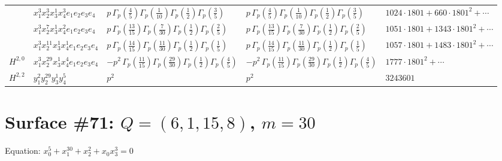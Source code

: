 \documentclass[11pt]{article}
\begin{document}
\begin{table}[ht]
{\begin{tabular}{@{}lllll@{}}
 & $x_{1}^{3} x_{2}^{3} x_{3}^{1} x_{4}^{3}  e_{1} e_{2} e_{3} e_{4}$ & $p \, \Gamma_p \left( \frac{4}{5} \right) \Gamma_p \left( \frac{1}{10} \right) \Gamma_p \left( \frac{1}{2} \right) \Gamma_p \left( \frac{3}{5} \right)$ & $p \, \Gamma_p \left( \frac{4}{5} \right) \Gamma_p \left( \frac{1}{10} \right) \Gamma_p \left( \frac{1}{2} \right) \Gamma_p \left( \frac{3}{5} \right)$ & $1024{\cdot}1801{+}660{\cdot}1801^{2}{+}\cdots$ \\
 & $x_{1}^{3} x_{2}^{7} x_{3}^{1} x_{4}^{2}  e_{1} e_{2} e_{3} e_{4}$ & $p \, \Gamma_p \left( \frac{13}{15} \right) \Gamma_p \left( \frac{7}{30} \right) \Gamma_p \left( \frac{1}{2} \right) \Gamma_p \left( \frac{2}{5} \right)$ & $p \, \Gamma_p \left( \frac{13}{15} \right) \Gamma_p \left( \frac{7}{30} \right) \Gamma_p \left( \frac{1}{2} \right) \Gamma_p \left( \frac{2}{5} \right)$ & $1051{\cdot}1801{+}1343{\cdot}1801^{2}{+}\cdots$ \\
 & $x_{1}^{3} x_{2}^{11} x_{3}^{1} x_{4}^{1}  e_{1} e_{2} e_{3} e_{4}$ & $p \, \Gamma_p \left( \frac{14}{15} \right) \Gamma_p \left( \frac{11}{30} \right) \Gamma_p \left( \frac{1}{2} \right) \Gamma_p \left( \frac{1}{5} \right)$ & $p \, \Gamma_p \left( \frac{14}{15} \right) \Gamma_p \left( \frac{11}{30} \right) \Gamma_p \left( \frac{1}{2} \right) \Gamma_p \left( \frac{1}{5} \right)$ & $1057{\cdot}1801{+}1483{\cdot}1801^{2}{+}\cdots$ \\
\midrule
$H^{2,0}$ & $x_{1}^{3} x_{2}^{29} x_{3}^{1} x_{4}^{4}  e_{1} e_{2} e_{3} e_{4}$ & $- p^{2} \, \Gamma_p \left( \frac{11}{15} \right) \Gamma_p \left( \frac{29}{30} \right) \Gamma_p \left( \frac{1}{2} \right) \Gamma_p \left( \frac{4}{5} \right)$ & $- p^{2} \, \Gamma_p \left( \frac{11}{15} \right) \Gamma_p \left( \frac{29}{30} \right) \Gamma_p \left( \frac{1}{2} \right) \Gamma_p \left( \frac{4}{5} \right)$ & $1777{\cdot}1801^{2}{+}\cdots$ \\
\midrule
$H^{2,2}$ & $y_{1}^{2} y_{2}^{29} y_{3}^{1} y_{4}^{5}$ & $p^{2} \,$ & $p^{2} \,$ & $3243601$ \\
\bottomrule
\end{tabular}
}
\renewcommand{\arraystretch}{1.0}
\end{table}

\newpage

\section*{Surface \#71: $Q=(6, 1, 15, 8)$, $m=30$}

Equation: $x_0^{5} + x_1^{30} + x_2^{2} + x_0 x_3^{3} = 0$
\end{document}
